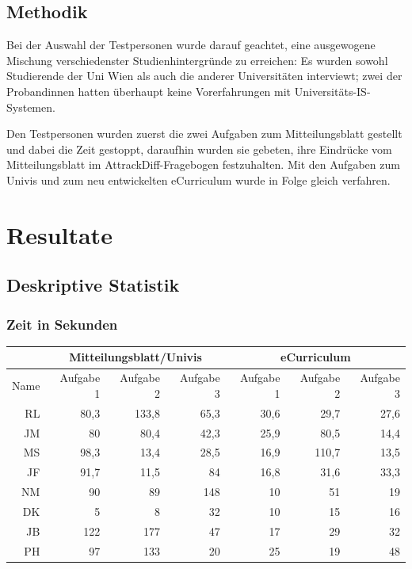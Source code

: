 \documentclass[a4paper,10pt]{scrartcl}
\begin{document}
\subsection{Methodik}

Bei der Auswahl der Testpersonen wurde darauf geachtet, eine ausgewogene Mischung verschiedenster Studienhintergründe zu erreichen: Es wurden sowohl Studierende der Uni Wien als auch die anderer Universitäten interviewt; zwei der Probandinnen hatten überhaupt keine Vorerfahrungen mit Universitäts-IS-Systemen.

Den Testpersonen wurden zuerst die zwei Aufgaben zum Mitteilungsblatt gestellt und dabei die Zeit gestoppt, daraufhin wurden sie gebeten, ihre Eindrücke vom Mitteilungsblatt im AttrackDiff-Fragebogen festzuhalten. Mit den Aufgaben zum Univis und zum neu entwickelten eCurriculum wurde in Folge gleich verfahren.

\pagebreak

\section{Resultate} 

\subsection{Deskriptive Statistik}

\subsubsection*{Zeit in Sekunden} 

\begin{center}
\begin{tabular}{r|r|r|r|r|r|r}
     & \multicolumn{3}{c|}{Mitteilungsblatt/Univis} & \multicolumn{3}{c}{eCurriculum} \\ \hline
    Name & Aufgabe 1 & Aufgabe 2 & Aufgabe 3 & Aufgabe 1 & Aufgabe 2 & Aufgabe 3  \\ \hline
    RL & 80,3 & 133,8 & 65,3 & 30,6 & 29,7 & 27,6 \\ \hline
    JM & 80 & 80,4 & 42,3 & 25,9 & 80,5 & 14,4 \\ \hline
    MS & 98,3 & 13,4 & 28,5 & 16,9 & 110,7 & 13,5 \\ \hline
    JF & 91,7 & 11,5 & 84 & 16,8 & 31,6 & 33,3 \\ \hline
    NM & 90 & 89 & 148 & 10 & 51 & 19\\ \hline
    DK & 5 & 8 & 32 & 10 & 15 & 16\\ \hline
    JB & 122 & 177 & 47 & 17 & 29 & 32 \\ \hline
    PH & 97 & 133 & 20 & 25 & 19 & 48 \\
\end{tabular}
\end{center}
\end{document}
